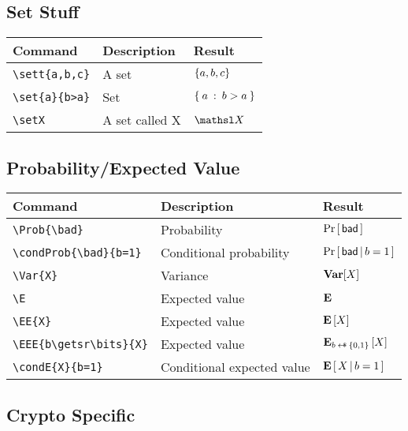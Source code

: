 \documentclass[11pt,twoside]{report}
\begin{document}
\subsection{Set Stuff}
\begin{center}
\begin{tabular}{l l l}
	\textbf{Command} & \textbf{Description} & \textbf{Result} \\\hline
	\lstinline$\sett{a,b,c}$ & A set & $\{a,b,c\}$  \\
	\lstinline$\set{a}{b>a}$ & Set & $\{\:a \: :\: b>a\:\}$  \\
	\lstinline$\setX$ & A set called X & $\setX$  \\
\end{tabular}
\end{center}

\subsection{Probability/Expected Value}
\begin{center}
\begin{tabular}{l l l}
	\textbf{Command} & \textbf{Description} & \textbf{Result} \\\hline
	\lstinline$\Prob{\bad}$ & Probability & ${\Pr\left[\,{\mathsf{bad}}\,\right]}$  \\
	\lstinline$\condProb{\bad}{b=1}$ & Conditional probability & ${\Pr}\left[\,\mathsf{bad}\,|\,b=1\,\right]$  \\
	\lstinline$\Var{X}$ & Variance & ${\mbox{\bf Var}}[X]$  \\
	\lstinline$\E$ & Expected value & $\mathbf{E}$  \\
	\lstinline$\EE{X}$ & Expected value & ${\mathbf{E}\left[{X}\right]}$  \\
	\lstinline$\EEE{b\getsr\bits}{X}$ & Expected value & $\EEE{b\getsr\bits}{X}$  \\
	\lstinline$\condE{X}{b=1}$ & Conditional expected value & ${\mathbf{E}}\left[\,X\,|\,b=1\,\right]$  \\
\end{tabular}
\end{center}



\subsection{Crypto Specific}
\end{document}
